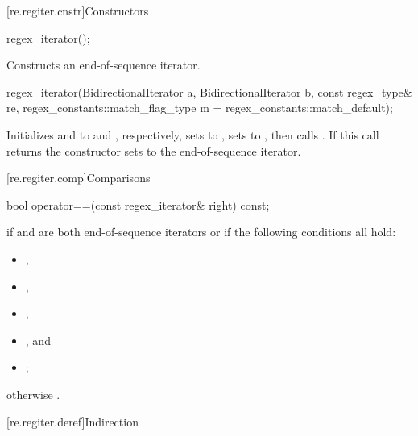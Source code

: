 [re.regiter.cnstr]{Constructors}

%
\begin{itemdecl}
regex_iterator();
\end{itemdecl}

\begin{itemdescr}
\pnum
\effects
Constructs an end-of-sequence iterator.
\end{itemdescr}

%
\begin{itemdecl}
regex_iterator(BidirectionalIterator a, BidirectionalIterator b,
               const regex_type& re,
               regex_constants::match_flag_type m = regex_constants::match_default);
\end{itemdecl}

\begin{itemdescr}
\pnum
\effects
Initializes  and  to
 and , respectively, sets
 to , sets  to
, then calls . If this
call returns  the constructor sets  to the end-of-sequence
iterator.
\end{itemdescr}

[re.regiter.comp]{Comparisons}

%
\begin{itemdecl}
bool operator==(const regex_iterator& right) const;
\end{itemdecl}

\begin{itemdescr}
\pnum
\returns
{} if  and  are both end-of-sequence
iterators or if the following conditions all hold:
\begin{itemize}
\item {},
\item {},
\item {},
\item {}, and
\item {};
\end{itemize}
otherwise .
\end{itemdescr}

[re.regiter.deref]{Indirection}

